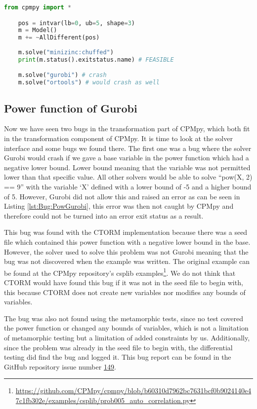\begin{lstlisting}[language=python, label={lst:Bug:NotGlobal}, caption={The “negation of global constraints”-bug.}]
	from cpmpy import *

	pos = intvar(lb=0, ub=5, shape=3)
	m = Model()
	m += ~AllDifferent(pos)
	
	m.solve("minizinc:chuffed")
	print(m.status().exitstatus.name) # FEASIBLE

	m.solve("gurobi") # crash
	m.solve("ortools") # would crash as well
\end{lstlisting}

\subsection{Power function of Gurobi}
\label{res:bug:Power}
Now we have seen two bugs in the transformation part of CPMpy, which both fit in the transformation component of CPMpy. It is time to look at the solver interface and some bugs we found there. The first one was a bug where the solver Gurobi would crash if we gave a base variable in the power function which had a negative lower bound. Lower bound meaning that the variable was not permitted lower than that specific value. All other solvers would be able to solve “pow(X, 2) == 9” with the variable ‘X’ defined with a lower bound of -5 and a higher bound of 5. However, Gurobi did not allow this and raised an error as can be seen in Listing \ref{lst:Bug:PowGurobi}, this error was then not caught by CPMpy and therefore could not be turned into an error exit status as a result.

This bug was found with the CTORM implementation because there was a seed file which contained this power function with a negative lower bound in the base. However, the solver used to solve this problem was not Gurobi meaning that the bug was not discovered when the example was written. The original example can be found at the CPMpy repository’s csplib examples\footnote{\url{https://github.com/CPMpy/cpmpy/blob/b60310d7962bc7631bcf0b9024140e47c1fb302e/examples/csplib/prob005_auto_correlation.py}}. We do not think that CTORM would have found this bug if it was not in the seed file to begin with, this because CTORM does not create new variables nor modifies any bounds of variables. 

The bug was also not found using the metamorphic tests, since no test covered the power function or changed any bounds of variables, which is not a limitation of metamorphic testing but a limitation of added constraints by us. 
Additionally, since the problem was already in the seed file to begin with, the differential testing did find the bug and logged it. This bug report can be found in the GitHub repository issue number \href{https://github.com/CPMpy/cpmpy/issues/149}{149}.

